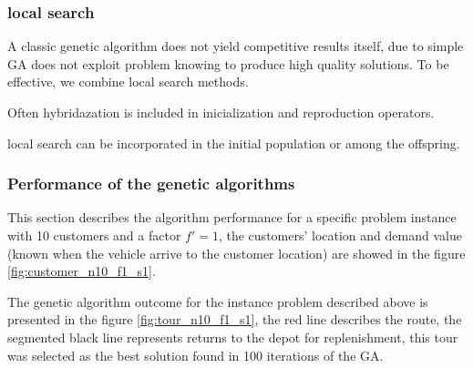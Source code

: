 



\subsubsection*{local search}


A classic genetic algorithm does not yield competitive results itself, due to simple GA does not exploit problem knowing to produce high quality solutions. To be effective, we combine local search methods.


Often hybridazation is included in inicialization and reproduction operators.

local search can be incorporated in the initial population or among the offspring.

\subsubsection*{Performance of the genetic algorithms}

This section describes the algorithm performance for a specific problem instance with 10 customers and a factor $f'=1$, the customers' location and demand value (known when the vehicle arrive to the customer location) are showed in the figure \ref{fig:customer_n10_f1_s1}.



The genetic algorithm outcome for the instance problem described above is presented in the figure \ref{fig:tour_n10_f1_s1}, the red line describes the route, the segmented black line represents returns to the depot for replenishment, this tour was selected as the best solution found in 100 iterations of the GA.


